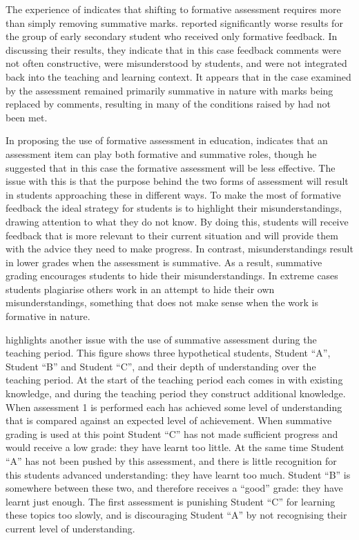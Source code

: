 The experience of \citet{Smith:2005} indicates that shifting to formative assessment requires more than simply removing summative marks. \citet{Smith:2005} reported significantly worse results for the group of early secondary student who received only formative feedback. In discussing their results, they indicate that in this case feedback comments were not often constructive, were misunderstood by students, and were not integrated back into the teaching and learning context. It appears that in the case examined by \citet{Smith:2005} the assessment remained primarily summative in nature with marks being replaced by comments, resulting in many of the conditions raised by \citet{Gibbs:2004} had not been met.

In proposing the use of formative assessment in education, \citet{Bloom:1969} indicates that an assessment item can play both formative and summative roles, though he suggested that in this case the formative assessment will be less effective. The issue with this is that the purpose behind the two forms of assessment will result in students approaching these in different ways. To make the most of formative feedback the ideal strategy for students is to highlight their misunderstandings, drawing attention to what they do not know. By doing this, students will receive feedback that is more relevant to their current situation and will provide them with the advice they need to make progress. In contrast, misunderstandings result in lower grades when the assessment is summative. As a result, summative grading encourages students to hide their misunderstandings. In extreme cases students plagiarise others work in an attempt to hide their own misunderstandings, something that does not make sense when the work is formative in nature. 

 highlights another issue with the use of summative assessment during the teaching period. This figure shows three hypothetical students, Student ``A'', Student ``B'' and Student ``C'', and their depth of understanding over the teaching period. At the start of the teaching period each comes in with existing knowledge, and during the teaching period they construct additional knowledge. When assessment 1 is performed each has achieved some level of understanding that is compared against an expected level of achievement. When summative grading is used at this point Student ``C'' has not made sufficient progress and would receive a low grade: they have learnt too little. At the same time Student ``A'' has not been pushed by this assessment, and there is little recognition for this students advanced understanding: they have learnt too much. Student ``B'' is somewhere between these two, and therefore receives a ``good'' grade: they have learnt just enough. The first assessment is punishing Student ``C'' for learning these topics too slowly, and is discouraging Student ``A'' by not recognising their current level of understanding.

